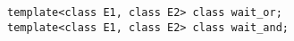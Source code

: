 
  \begin{lstlisting}[mathescape]
template<class E1, class E2> class wait_or;
template<class E1, class E2> class wait_and;
  \end{lstlisting}
